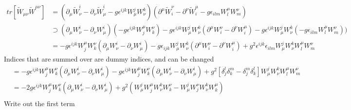 \documentclass[11pt]{article}
\begin{document}
\begin{align*}
tr[\tilde{W}_{\mu \nu} \tilde{W}^{\mu \nu}] &= (\partial_{\mu} \tilde{W}_{\nu}^i 
- \partial_{\nu} \tilde{W}_{\mu}^i 
- g \epsilon^{ijk} W_{\mu}^j W_{\nu}^k )
(\partial^{\mu} \tilde{W}^{\nu}_i 
- \partial^{\nu} \tilde{W}^{\mu}_i 
- g \epsilon_{ilm} W^{\mu}_l W^{\nu}_m) \\
& \supset (\partial_{\mu} W_{\nu}^i 
- \partial_{\nu} W_{\mu}^i)(- g \epsilon^{ijk} W^{\mu}_j W^{\nu}_k)
- g \epsilon^{ijk} W_{\mu}^j W_{\nu}^k  (\partial^{\mu} W^{\nu}_i 
- \partial^{\nu} W^{\mu}_i )
- g \epsilon^{ijk} W_{\mu}^j W_{\nu}^k (- g \epsilon_{ilm} W^{\mu}_l W^{\nu}_m))\\
&= - g \epsilon^{ijk} W^{\mu}_j W^{\nu}_k(\partial_{\mu} W_{\nu}^i 
- \partial_{\nu} W_{\mu}^i)
- g \epsilon_{ijk} W_{\mu}^j W_{\nu}^k  (\partial^{\mu} W^{\nu}_i 
- \partial^{\nu} W^{\mu}_i )
+ g^2 \epsilon^{ijk}  \epsilon_{ilm} W_{\mu}^j W_{\nu}^k W^{\mu}_l W^{\nu}_m
\end{align*} 
Indices that are summed over are dummy indices, and can be changed
\begin{align*}
&= - g \epsilon^{ijk} W^{\mu}_j W^{\nu}_k(\partial_{\mu} W_{\nu}^i 
- \partial_{\nu} W_{\mu}^i)
- g \epsilon^{ijk} W^{\mu}_j W^{\nu}_k  (\partial_{\mu} W_{\nu}^i 
- \partial_{\nu} W_{\mu}^i )
+ g^2 [\delta_j^l \delta_k^m - \delta_j^m \delta_k^l] W_{\mu}^j W_{\nu}^k W^{\mu}_l W^{\nu}_m\\
&= - 2 g \epsilon^{ijk} W^{\mu}_j W^{\nu}_k(\partial_{\mu} W_{\nu}^i 
- \partial_{\nu} W_{\mu}^i)
+ g^2 (W_{\mu}^j W^{\mu}_j W_{\nu}^k W^{\nu}_k - W_{\mu}^j W^{\nu}_j W_{\nu}^k W^{\mu}_k )\\
\end{align*}
Write out the first term
\end{document}

